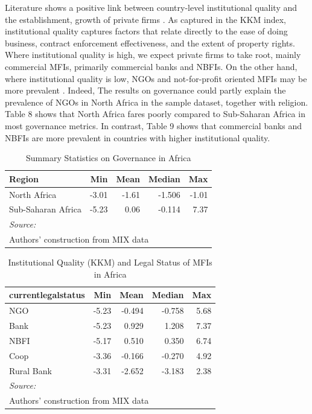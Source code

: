 \documentclass[a4paper, nobind]{templates/ociamthesis}
\begin{document}
Literature shows a positive link between country-level institutional quality and the establishment, growth of private firms \autocite{sobel2008testing}. As captured in the KKM index, institutional quality captures factors that relate directly to the ease of doing business, contract enforcement effectiveness, and the extent of property rights. Where institutional quality is high, we expect private firms to take root, mainly commercial MFIs, primarily commercial banks and NBFIs. On the other hand, where institutional quality is low, NGOs and not-for-profit oriented MFIs may be more prevalent \autocite{kuzey2021link}. Indeed, The results on governance could partly explain the prevalence of NGOs in North Africa in the sample dataset, together with religion. Table 8 shows that North Africa fares poorly compared to Sub-Saharan Africa in most governance metrics. In contrast, Table 9 shows that commercial banks and NBFIs are more prevalent in countries with higher institutional quality.

\begin{table}

\caption{\label{tab:unnamed-chunk-38}Summary Statistics on Governance in Africa}
\centering
\begin{tabular}[t]{lrrrr}
\toprule
Region & Min & Mean & Median & Max\\
\midrule
North Africa & -3.01 & -1.61 & -1.506 & -1.01\\
Sub-Saharan Africa & -5.23 & 0.06 & -0.114 & 7.37\\
\bottomrule
\multicolumn{5}{l}{\rule{0pt}{1em}\textit{Source: }}\\
\multicolumn{5}{l}{\rule{0pt}{1em}Authors' construction from MIX data}\\
\end{tabular}
\end{table}

\begin{table}

\caption{\label{tab:unnamed-chunk-39}Institutional Quality (KKM) and Legal Status of MFIs in Africa}
\centering
\begin{tabular}[t]{lrrrr}
\toprule
currentlegalstatus & Min & Mean & Median & Max\\
\midrule
NGO & -5.23 & -0.494 & -0.758 & 5.68\\
Bank & -5.23 & 0.929 & 1.208 & 7.37\\
NBFI & -5.17 & 0.510 & 0.350 & 6.74\\
Coop & -3.36 & -0.166 & -0.270 & 4.92\\
Rural Bank & -3.31 & -2.652 & -3.183 & 2.38\\
\bottomrule
\multicolumn{5}{l}{\rule{0pt}{1em}\textit{Source: }}\\
\multicolumn{5}{l}{\rule{0pt}{1em}Authors' construction from MIX data}\\
\end{tabular}
\end{table}
\end{document}
